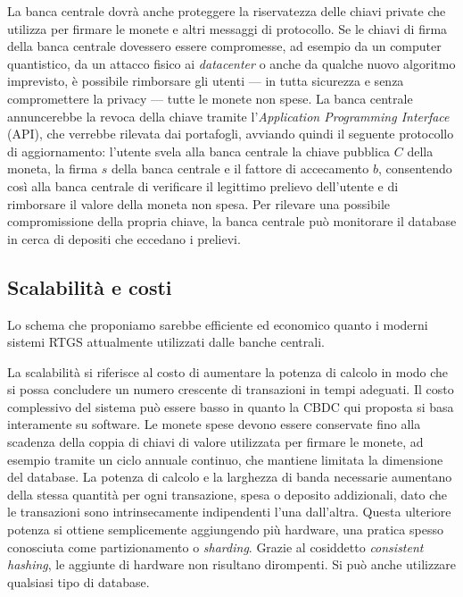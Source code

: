 \documentclass{article}
\begin{document}
La banca centrale dovrà anche proteggere la riservatezza delle chiavi 
private che utilizza per firmare le monete e altri messaggi di 
protocollo. Se le chiavi di firma della banca centrale dovessero 
essere compromesse, ad esempio da un computer quantistico, da un 
attacco fisico ai \textit{datacenter} o anche da qualche nuovo algoritmo 
imprevisto, è possibile rimborsare gli utenti --- in tutta sicurezza e 
senza compromettere la privacy --- tutte le monete non spese. La banca 
centrale annuncerebbe la revoca della chiave tramite l'\textit{Application 
Programming Interface} (API), che verrebbe rilevata dai portafogli, 
avviando quindi il seguente protocollo di aggiornamento: l'utente 
svela alla banca centrale la chiave pubblica $C$ della moneta, la firma 
$s$ della banca centrale e il fattore di accecamento $b$, consentendo così 
alla banca centrale di verificare il legittimo prelievo dell'utente e 
di rimborsare il valore della moneta non spesa. Per rilevare una 
possibile compromissione della propria chiave, la banca centrale può 
monitorare il database in cerca di depositi che eccedano i prelievi. 

\subsection{Scalabilità e costi}\label{scalabilità-e-costi}

Lo schema che proponiamo sarebbe efficiente ed economico quanto i 
moderni sistemi RTGS attualmente utilizzati dalle banche centrali.

La scalabilità si riferisce al costo di aumentare la potenza di 
calcolo in modo che si possa concludere un numero crescente di 
transazioni in tempi adeguati. Il costo complessivo del sistema può 
essere basso in quanto la CBDC qui proposta si basa interamente su 
software. Le monete spese devono essere conservate fino alla scadenza 
della coppia di chiavi di valore utilizzata per firmare le monete, ad 
esempio tramite un ciclo annuale continuo, che mantiene limitata la 
dimensione del database. La potenza di calcolo e la larghezza di banda 
necessarie aumentano della stessa quantità per ogni transazione, spesa 
o deposito addizionali, dato che le transazioni sono intrinsecamente 
indipendenti l'una dall'altra. Questa ulteriore potenza si ottiene 
semplicemente aggiungendo più hardware, una pratica spesso conosciuta 
come partizionamento o \textit{sharding}. Grazie al cosiddetto 
\textit{consistent hashing}, le aggiunte di hardware non risultano 
dirompenti. Si può anche utilizzare qualsiasi tipo di database.
\end{document}
